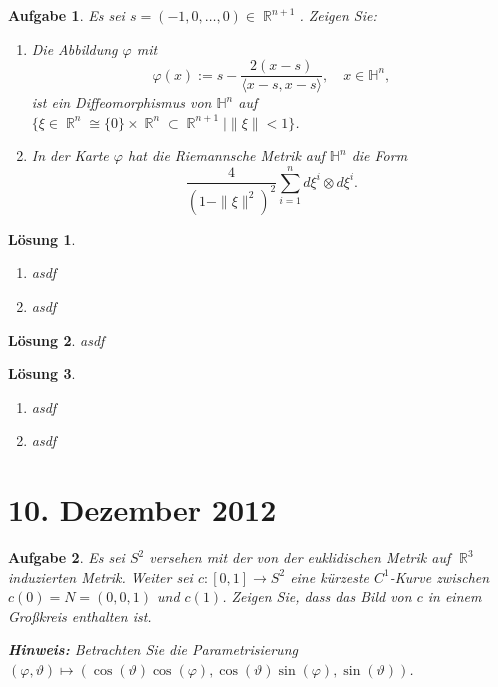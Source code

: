 \documentclass[paper=A4, twoside, chapterprefix=true, bibliography=totoc, headsepline]{scrbook}
\let\temp\phi{}
\let\phi\varphi{}
\let\varphi\temp{}
\let\temp\theta{}
\let\theta\vartheta{}
\let\vartheta\temp{}
\let\temp\epsilon{}
\let\epsilon\varepsilon{}
\let\varepsilon\temp{}
\let\temp\rho{}
\let\rho\varrho{}
\let\varrho\temp{}
\DeclareMathOperator{\R}{\mathbb{R}}
\newcommand{\tensor}{\otimes}
\theoremstyle{plain}
\theoremstyle{nonumberplain}
\theoremstyle{empty}
\theoremstyle{break}
\newtheorem{Aufg}{Aufgabe}
\newtheorem{Loes}{L\"osung}
\begin{document}
\begin{Aufg}
Es sei $s=(-1,0,\dots,0) \in \R^{n+1}$. Zeigen Sie:
\begin{enumerate}[label=\alph*),leftmargin=*,widest=b]
\item
	Die Abbildung $\phi$ mit 
		\[\phi(x):=s-\frac{2 (x-s)}{\langle x-s,x-s\rangle}, \quad x\in \mathbb{H}^n, \]
	ist ein Diffeomorphismus von $\mathbb{H}^n$ auf $\{\xi \in \R^n \cong \{0\} \times \R^n\subset \R^{n+1} \mid \| \xi\|<1\}$.
\item
	In der Karte $\phi$ hat die Riemannsche Metrik auf $\mathbb{H}^n$ die Form \[ \frac{4}{(1-\|\xi \|^2)^2} \sum_{i=1}^nd\xi^i \tensor d\xi^i.\] 
\end{enumerate}\end{Aufg}

\begin{Loes}\begin{enumerate}[label=\alph*),leftmargin=*,widest=b]
\item
	asdf
\item
	asdf
\end{enumerate}\end{Loes}

\begin{Loes}
asdf
\end{Loes}

\begin{Loes}\begin{enumerate}[label=\alph*),leftmargin=*,widest=b]
\item
	asdf
\item
	asdf
\end{enumerate}\end{Loes}


\section{10. Dezember 2012}
\setcounter{Aufg}{0} %
\setcounter{Loes}{0}

\begin{Aufg}
Es sei $S^2$ versehen mit der von der euklidischen Metrik auf $\R^3$ induzierten Metrik. Weiter sei $c:[0,1] \to S^2$ eine kürzeste $C^1$-Kurve zwischen $c(0)=N=(0,0,1)$ und $c(1)$. Zeigen Sie, dass das Bild von $c$ in einem Großkreis enthalten ist.

{\footnotesize \textbf{Hinweis:} Betrachten Sie die Parametrisierung $(\phi,\theta)\mapsto (\cos(\theta) \cos(\phi),\cos(\theta) \sin(\phi),\sin(\theta))$.}
\end{Aufg}
\end{document}
